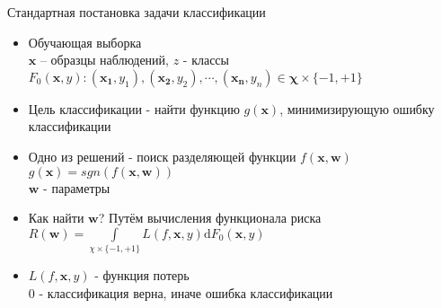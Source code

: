 \documentclass[11pt]{beamer}
\begin{document}
\begin{frame}{Стандартная постановка задачи классификации}

\begin{itemize}
	\item Обучающая выборка \\
		\(\mathbf{x}\) – образцы наблюдений, \(z\) - классы \\
		\(F_{0}(\mathbf{x}, y): (\mathbf{x_1}, y_1), (\mathbf{x_2}, y_2), \cdots, (\mathbf{x_n}, y_n) \in \mathbf{\chi} \times  \{-1, +1\} \)
	\item Цель классификации - найти функцию \(g(\mathbf{x})\), минимизирующую ошибку классификации
	\item Одно из решений - поиск разделяющей функции \(f(\mathbf{x}, \mathbf{w})\) \\
		\(g(\mathbf{x}) = sgn(f(\mathbf{x}, \mathbf{w}))\) \\
		\(\mathbf{w}\) - параметры
	\item Как найти \(\mathbf{w}\)? Путём вычисления функционала риска\\
		\(R(\mathbf{w}) = \int \limits_{\chi \times \{-1, +1\}} L(f, \mathbf{x}, y) \mathrm{d} F_0(\mathbf{x}, y)\)
	\item \(L(f, \mathbf{x}, y)\) - функция потерь \\
		\(0\) - классификация верна, иначе ошибка классификации
\end{itemize}

\end{frame}
\end{document}
